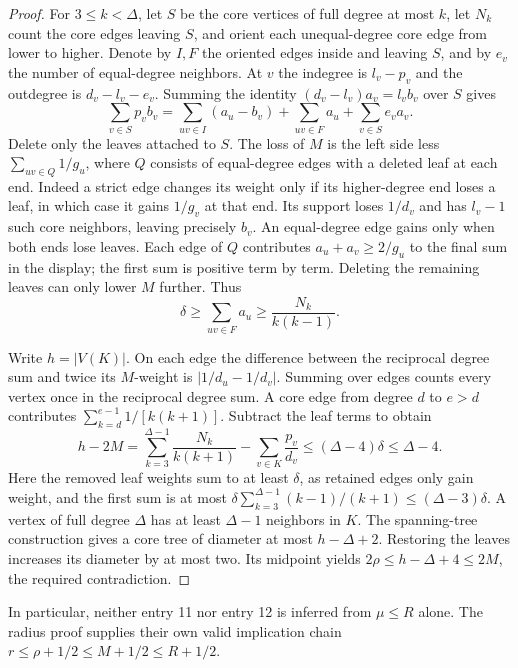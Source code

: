 \documentclass[11pt,a4paper]{article}
\theoremstyle{remark}\newtheorem{remark}[theorem]{Remark}
\begin{document}
\begin{proof}
For $3\le k<\Delta$, let $S$ be the core vertices of full degree at
most $k$, let $N_k$ count the core edges leaving $S$, and orient each
unequal-degree core edge from lower to higher. Denote by $I,F$ the
oriented edges inside and leaving $S$, and by $e_v$ the number of
equal-degree neighbors. At $v$ the indegree is $l_v-p_v$ and the
outdegree is $d_v-l_v-e_v$. Summing the identity
$(d_v-l_v)a_v=l_vb_v$ over $S$ gives
\[
 \sum_{v\in S}p_v b_v
  =\sum_{uv\in I}(a_u-b_v)+\sum_{uv\in F}a_u+\sum_{v\in S}e_v a_v.
\]
Delete only the leaves attached to $S$. The loss of $M$ is the left
side less $\sum_{uv\in Q}1/g_u$, where $Q$ consists of equal-degree
edges with a deleted leaf at each end. Indeed a strict edge changes its
weight only if its higher-degree end loses a leaf, in which case it gains
$1/g_v$ at that end. Its support loses $1/d_v$ and has $l_v-1$ such
core neighbors, leaving precisely $b_v$. An equal-degree edge gains
only when both ends lose leaves.
Each edge of $Q$ contributes $a_u+a_v\ge2/g_u$ to the final sum in the
display; the first sum is positive term by term. Deleting the remaining
leaves can only lower $M$ further. Thus
\[
 \delta\ge\sum_{uv\in F}a_u\ge \frac{N_k}{k(k-1)}.
\]

Write $h=|V(K)|$. On each edge the difference between the reciprocal
degree sum and twice its $M$-weight is $|1/d_u-1/d_v|$. Summing over
edges counts every vertex once in the reciprocal degree sum.
A core edge from degree $d$ to $e>d$ contributes
$\sum_{k=d}^{e-1}1/[k(k+1)]$. Subtract the leaf terms to obtain
\[
 h-2M=\sum_{k=3}^{\Delta-1}\frac{N_k}{k(k+1)}
          -\sum_{v\in K}\frac{p_v}{d_v}\le(\Delta-4)\delta\le\Delta-4.
\]
Here the removed leaf weights sum to at least $\delta$, as retained
edges only gain weight, and the first sum is at most
$\delta\sum_{k=3}^{\Delta-1}(k-1)/(k+1)\le(\Delta-3)\delta$.
A vertex of full degree $\Delta$ has at least $\Delta-1$ neighbors
in $K$. The spanning-tree construction gives a core tree of diameter
at most $h-\Delta+2$. Restoring the leaves increases its diameter by
at most two. Its midpoint yields $2\rho\le h-\Delta+4\le2M$, the
required contradiction.

\end{proof}
In particular, neither entry 11 nor entry 12 is inferred from
$\mu\le R$ alone. The radius proof supplies their own valid implication chain
$r\le\rho+1/2\le M+1/2\le R+1/2$.
\end{document}
